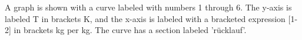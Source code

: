 A graph is shown with a curve labeled with numbers 1 through 6. The y-axis is labeled T in brackets K, and the x-axis is labeled with a bracketed expression [1-2] in brackets kg per kg. The curve has a section labeled 'rücklauf'.